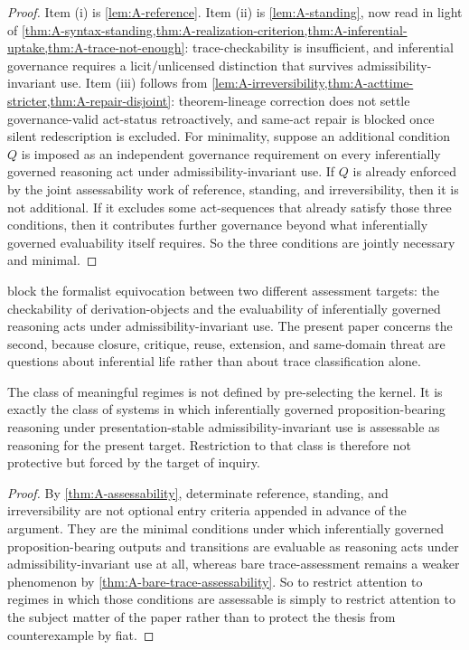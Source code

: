 \begin{proof}
Item (i) is \cref{lem:A-reference}. Item (ii) is \cref{lem:A-standing}, now read in light of
\cref{thm:A-syntax-standing,thm:A-realization-criterion,thm:A-inferential-uptake,thm:A-trace-not-enough}: trace-checkability is insufficient, and inferential governance requires a licit/unlicensed distinction that survives admissibility-invariant use. Item (iii) follows from \cref{lem:A-irreversibility,thm:A-acttime-stricter,thm:A-repair-disjoint}: theorem-lineage correction does not settle governance-valid act-status retroactively, and same-act repair is blocked once silent redescription is excluded. For minimality, suppose an additional condition $Q$ is imposed as an independent governance requirement on every inferentially governed reasoning act under admissibility-invariant use. If $Q$ is already enforced by the joint assessability work of reference, standing, and irreversibility, then it is not additional. If it excludes some act-sequences that already satisfy those three conditions, then it contributes further governance beyond what inferentially governed evaluability itself requires. So the three conditions are jointly necessary and minimal.
\end{proof}

\begin{remark}
 block the formalist equivocation
between two different assessment targets: the checkability of derivation-objects and the evaluability
of inferentially governed reasoning acts under admissibility-invariant use. The present paper concerns the second, because closure,
critique, reuse, extension, and same-domain threat are questions about inferential life rather than about
trace classification alone.
\end{remark}

\begin{corollary}
\label{cor:A-target-class}
The class of meaningful regimes is not defined by pre-selecting the kernel. It is exactly the class of systems in which inferentially governed proposition-bearing reasoning under presentation-stable admissibility-invariant use is assessable as reasoning for the present target. Restriction to that class is therefore not protective but forced by the target of inquiry.
\end{corollary}

\begin{proof}
By \cref{thm:A-assessability}, determinate reference, standing, and irreversibility are not optional entry criteria appended in advance of the argument. They are the minimal conditions under which inferentially governed proposition-bearing outputs and transitions are evaluable as reasoning acts under admissibility-invariant use at all, whereas bare trace-assessment remains a weaker phenomenon by \cref{thm:A-bare-trace-assessability}. So to restrict attention to regimes in which those conditions are assessable is simply to restrict attention to the subject matter of the paper rather than to protect the thesis from counterexample by fiat.
\end{proof}

